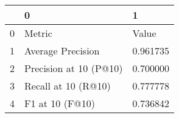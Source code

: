 \begin{tabular}{lll}
\toprule
 & 0 & 1 \\
\midrule
0 & Metric & Value \\
1 & Average Precision & 0.961735 \\
2 & Precision at 10 (P@10) & 0.700000 \\
3 & Recall at 10 (R@10) & 0.777778 \\
4 & F1 at 10 (F@10) & 0.736842 \\
\bottomrule
\end{tabular}
